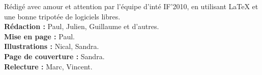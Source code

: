 





\tableofcontents
\begin{multicols}{2}
{
    \begin{center}
\footnotesize
Rédigé avec amour et attention par l'équipe d'inté IF'2010, en utilisant
\LaTeX{} et une bonne tripotée de logiciels libres. \\
\textbf{Rédaction : }Paul, Julien, Guillaume et d'autres.\\
\textbf{Mise en page : }Paul.\\
\textbf{Illustrations :} Nical, Sandra.\\
\textbf{Page de couverture :} Sandra.\\
\textbf{Relecture :} Marc, Vincent.\\
\normalsize
\cc \ccby \ccnc \ccsa
\end{center}
}
\end{multicols}

